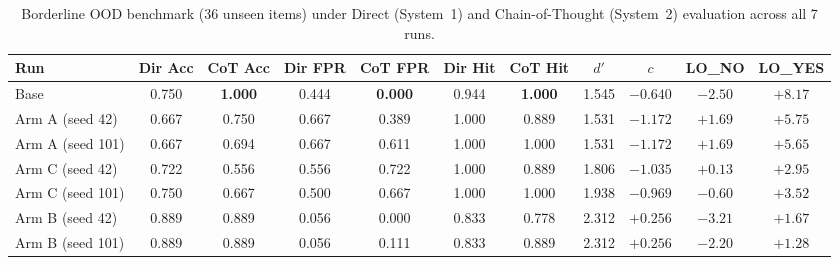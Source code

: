 \documentclass[11pt,a4paper]{article}
\begin{document}
\begin{table}[t]
\centering
\caption{Borderline OOD benchmark (36 unseen items) under Direct (System~1) and Chain-of-Thought (System~2) evaluation across all 7 runs.}
\label{tab:borderline}
\small
\begin{tabular}{lcccccccccc}
\toprule
\textbf{Run} & \textbf{Dir Acc} & \textbf{CoT Acc} & \textbf{Dir FPR} & \textbf{CoT FPR} & \textbf{Dir Hit} & \textbf{CoT Hit} & $d'$ & $c$ & \textbf{LO\_NO} & \textbf{LO\_YES} \\
\midrule
Base             & 0.750 & \textbf{1.000} & 0.444 & \textbf{0.000} & 0.944 & \textbf{1.000} & 1.545 & $-0.640$ & $-2.50$ & $+8.17$ \\
Arm A (seed 42)  & 0.667 & 0.750 & 0.667 & 0.389 & 1.000 & 0.889 & 1.531 & $-1.172$ & $+1.69$ & $+5.75$ \\
Arm A (seed 101) & 0.667 & 0.694 & 0.667 & 0.611 & 1.000 & 1.000 & 1.531 & $-1.172$ & $+1.69$ & $+5.65$ \\
Arm C (seed 42)  & 0.722 & 0.556 & 0.556 & 0.722 & 1.000 & 0.889 & 1.806 & $-1.035$ & $+0.13$ & $+2.95$ \\
Arm C (seed 101) & 0.750 & 0.667 & 0.500 & 0.667 & 1.000 & 1.000 & 1.938 & $-0.969$ & $-0.60$ & $+3.52$ \\
Arm B (seed 42)  & 0.889 & 0.889 & 0.056 & 0.000 & 0.833 & 0.778 & 2.312 & $+0.256$ & $-3.21$ & $+1.67$ \\
Arm B (seed 101) & 0.889 & 0.889 & 0.056 & 0.111 & 0.833 & 0.889 & 2.312 & $+0.256$ & $-2.20$ & $+1.28$ \\
\bottomrule
\end{tabular}
\end{table}
\end{document}
